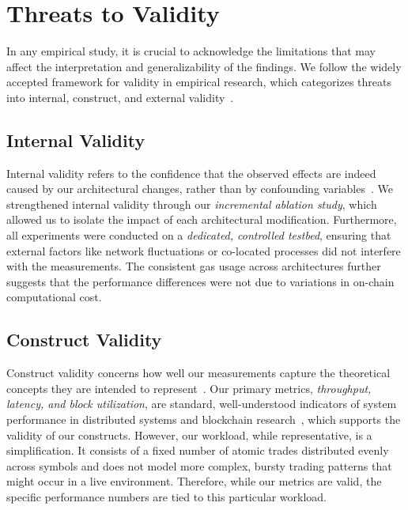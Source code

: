 \section{Threats to Validity}

\label{sec:threats}

In any empirical study, it is crucial to acknowledge the limitations that may affect the interpretation and generalizability of the findings. We follow the widely accepted framework for validity in empirical research, which categorizes threats into internal, construct, and external validity~\cite{shadish2002experimental}.

\subsection{Internal Validity}

Internal validity refers to the confidence that the observed effects are indeed caused by our architectural changes, rather than by confounding variables~\cite{shadish2002experimental}. We strengthened internal validity through our \textit{incremental ablation study}, which allowed us to isolate the impact of each architectural modification. Furthermore, all experiments were conducted on a \textit{dedicated, controlled testbed}, ensuring that external factors like network fluctuations or co-located processes did not interfere with the measurements. The consistent gas usage across architectures further suggests that the performance differences were not due to variations in on-chain computational cost.

\subsection{Construct Validity}

Construct validity concerns how well our measurements capture the theoretical concepts they are intended to represent~\cite{shadish2002experimental}. Our primary metrics, \textit{throughput, latency, and block utilization}, are standard, well-understood indicators of system performance in distributed systems and blockchain research~\cite{hennessy2017computer}, which supports the validity of our constructs. However, our workload, while representative, is a simplification. It consists of a fixed number of atomic trades distributed evenly across symbols and does not model more complex, bursty trading patterns that might occur in a live environment. Therefore, while our metrics are valid, the specific performance numbers are tied to this particular workload.

